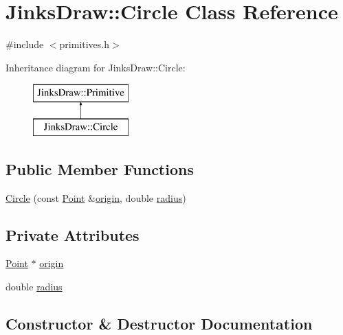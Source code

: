 \hypertarget{class_jinks_draw_1_1_circle}{}\section{Jinks\+Draw\+:\+:Circle Class Reference}
\label{class_jinks_draw_1_1_circle}


{\ttfamily \#include $<$primitives.\+h$>$}

Inheritance diagram for Jinks\+Draw\+:\+:Circle\+:\begin{figure}[H]
\begin{center}
\leavevmode
\includegraphics[height=2.000000cm]{class_jinks_draw_1_1_circle}
\end{center}
\end{figure}
\subsection*{Public Member Functions}
\begin{DoxyCompactItemize}
\item 
\mbox{\hyperlink{class_jinks_draw_1_1_circle_a2314f653a621d22c778b39373b6d1481}{Circle}} (const \mbox{\hyperlink{class_jinks_draw_1_1_point}{Point}} \&\mbox{\hyperlink{class_jinks_draw_1_1_circle_a2214560f54448ce8c0bbb41dc956abe4}{origin}}, double \mbox{\hyperlink{class_jinks_draw_1_1_circle_ad38af0c31ab4aa5d90aaf6cf83a60ab2}{radius}})
\end{DoxyCompactItemize}
\subsection*{Private Attributes}
\begin{DoxyCompactItemize}
\item 
\mbox{\hyperlink{class_jinks_draw_1_1_point}{Point}} $\ast$ \mbox{\hyperlink{class_jinks_draw_1_1_circle_a2214560f54448ce8c0bbb41dc956abe4}{origin}}
\item 
double \mbox{\hyperlink{class_jinks_draw_1_1_circle_ad38af0c31ab4aa5d90aaf6cf83a60ab2}{radius}}
\end{DoxyCompactItemize}


\subsection{Constructor \& Destructor Documentation}
\mbox{\label{class_jinks_draw_1_1_circle_a2314f653a621d22c778b39373b6d1481}} 
